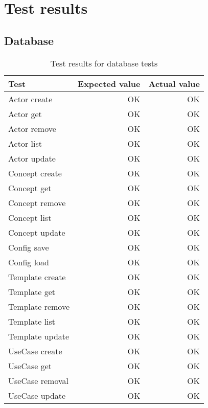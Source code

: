 

\chapter{Test results}
\section{Database}
\begin{table}[!htbp]
\centering
\begin{tabular}{ | l | r | r | }
   \hline
   Test            & Expected value & Actual value \\ \hline
   Actor create    & OK             & OK           \\
   Actor get       & OK             & OK           \\
   Actor remove    & OK             & OK           \\
   Actor list      & OK             & OK           \\
   Actor update    & OK             & OK           \\
   Concept create  & OK             & OK           \\ 
   Concept get     & OK             & OK           \\
   Concept remove  & OK             & OK           \\
   Concept list    & OK             & OK           \\
   Concept update  & OK             & OK           \\
   Config save     & OK             & OK           \\
   Config load     & OK             & OK           \\
   Template create & OK             & OK           \\
   Template get    & OK             & OK           \\
   Template remove & OK             & OK           \\
   Template list   & OK             & OK           \\
   Template update & OK             & OK           \\
   UseCase create  & OK             & OK           \\
   UseCase get     & OK             & OK           \\
   UseCase removal & OK             & OK           \\
   UseCase update  & OK             & OK           \\
   \hline
\end{tabular}
\caption{Test results for database tests}
\label{tab:test-results-database}
\end{table}


